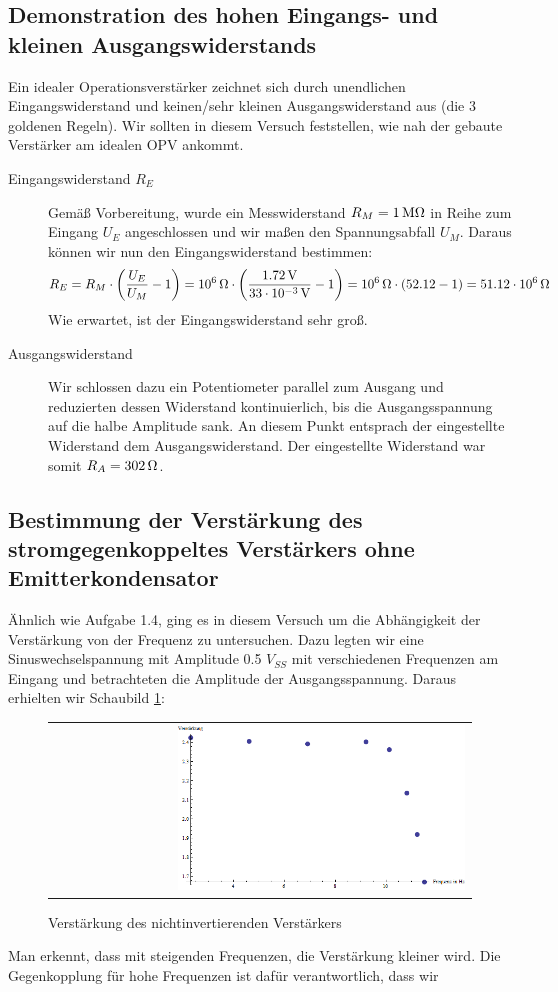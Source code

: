 \documentclass[a4paper,titlepage]{scrartcl}
\numberwithin{equation}{section}
\begin{document}
\subsection{Demonstration des hohen Eingangs- und kleinen Ausgangswiderstands}
Ein idealer Operationsverstärker zeichnet sich durch unendlichen Eingangswiderstand und keinen/sehr kleinen Ausgangswiderstand aus (die 3 goldenen Regeln).  Wir sollten in diesem Versuch feststellen, wie nah der gebaute Verstärker am idealen OPV ankommt.
\begin{description}
\item[Eingangswiderstand $R_E$] Gemäß Vorbereitung, wurde ein Messwiderstand $R_M=\unit[1]{M \Omega}$ in Reihe zum Eingang $U_E$ angeschlossen und wir maßen den Spannungsabfall $U_M$. Daraus können wir nun den Eingangswiderstand bestimmen:
\begin{equation*}
R_E=R_M \cdot \left(\frac{U_E}{U_M}-1\right)=\unit[10^6]{\Omega} \cdot \left(\frac{\unit[1.72]{V}}{\unit[33 \cdot 10^{-3}]{V}}-1\right)=\unit[10^6]{\Omega} \cdot (52.12 - 1) = \unit[51.12 \cdot 10^6]{\Omega}
\end{equation*}
Wie erwartet, ist der Eingangswiderstand sehr groß.
\item[Ausgangswiderstand] Wir schlossen dazu ein Potentiometer parallel zum Ausgang und reduzierten dessen Widerstand kontinuierlich, bis die Ausgangsspannung auf die halbe Amplitude sank. An diesem Punkt entsprach der eingestellte Widerstand dem Ausgangswiderstand. Der eingestellte Widerstand war somit $R_A=\unit[302]{\Omega}$.
\end{description}
\subsection{Bestimmung der Verstärkung des stromgegenkoppeltes Verstärkers ohne Emitterkondensator}
Ähnlich wie Aufgabe 1.4, ging es in diesem Versuch um die Abhängigkeit der Verstärkung von der Frequenz zu untersuchen. Dazu legten wir eine Sinuswechselspannung mit Amplitude 0.5 $V_{SS}$ mit verschiedenen Frequenzen am Eingang und betrachteten die Amplitude der Ausgangsspannung. Daraus erhielten wir Schaubild \ref{fig:aufgabe23}:
\begin{figure}[H]
	\centering
	\begin{tabular}{@{}r@{}}
		\includegraphics[width=0.7\textwidth]{bilder/aufgabe23.png}\\
	\end{tabular}
	\caption{Verstärkung des nichtinvertierenden Verstärkers}
	\label{fig:aufgabe23}
\end{figure}
Man erkennt, dass mit steigenden Frequenzen, die Verstärkung kleiner wird. Die Gegenkopplung für hohe Frequenzen ist dafür verantwortlich, dass wir
\end{document}
